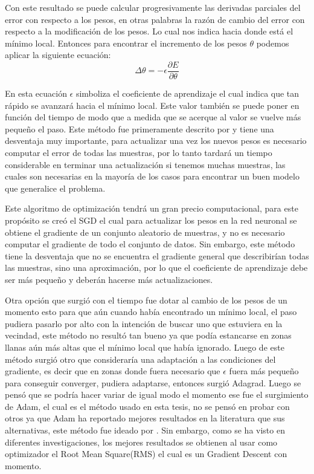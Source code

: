 \par Con este resultado se puede calcular progresivamente las derivadas parciales del error con respecto a los pesos, en otras palabras la razón de cambio del error con respecto a la modificación de los pesos. Lo cual nos indica hacia donde está el mínimo local. Entonces para encontrar el incremento de los pesos $\theta$ podemos aplicar la siguiente ecuación:
\[ \Delta \theta =-\epsilon \frac{\partial E}{\partial \theta }\]

\par En esta ecuación $\epsilon$ simboliza el coeficiente de aprendizaje el cual indica que tan rápido se avanzará hacia el mínimo local. Este valor también se puede poner en función del tiempo de modo que a medida que se acerque al valor se vuelve más pequeño el paso. Este método fue primeramente descrito por \textcite{rumelhart1986learning} y tiene una desventaja muy importante, para actualizar una vez los nuevos pesos es necesario computar el error de todas las muestras, por lo tanto tardará un tiempo considerable en terminar una actualización si tenemos muchas muestras, las cuales son necesarias en la mayoría de los casos para encontrar un buen modelo que generalice el problema.

\par Este algoritmo de optimización tendrá un gran precio computacional, para este propósito se creó el \gls{SGD} el cual para actualizar los pesos en la red neuronal se obtiene el gradiente de un conjunto aleatorio de muestras, y no es necesario computar el gradiente de todo el conjunto de datos. Sin embargo, este método tiene la desventaja que no se encuentra el gradiente general que describirían todas las muestras, sino una aproximación, por lo que el coeficiente de aprendizaje debe ser más pequeño y deberán hacerse más actualizaciones.

\par Otra opción que surgió con el tiempo fue dotar al cambio de los pesos de un momento esto para que aún cuando había encontrado un mínimo local, el paso pudiera pasarlo por alto con la intención de buscar uno que estuviera en la vecindad, este método no resultó tan bueno ya que podía estancarse en zonas llanas aún más altas que el mínimo local que había ignorado. Luego de este método surgió otro que consideraría una adaptación a las condiciones del gradiente, es decir que en zonas donde fuera necesario que $\epsilon$ fuera más pequeño para conseguir converger, pudiera adaptarse, entonces surgió Adagrad. Luego se pensó que se podría hacer variar de igual modo el momento ese fue el surgimiento de Adam, el cual es el método usado en esta tesis, no se pensó en probar con otros ya que Adam ha reportado mejores resultados en la literatura que sus alternativas, este método fue ideado por \textcite{kingma2014adam}.  Sin embargo, como se ha visto en diferentes investigaciones, los mejores resultados se obtienen al usar como optimizador el Root Mean Square(RMS) el cual es un Gradient Descent con momento.
\nocite{DBLP:journals/corr/Ruder16}

